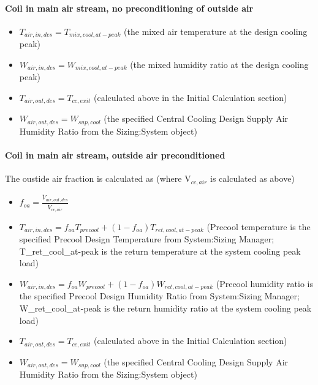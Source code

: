 \paragraph{\texorpdfstring{\textbf{Coil in main air stream, no preconditioning of outside air} }{Coil in main air stream, no preconditioning of outside air }}\label{coil-in-main-air-stream-no-preconditioning-of-outside-air}

\begin{itemize}
\item
  \(T_{air,in,des} = T_{mix,cool,at-peak}\) (the mixed air temperature at the design cooling peak)
\item
  \(W_{air,in,des} = W_{mix,cool,at-peak}\) (the mixed humidity ratio at the design cooling peak)
\item
  \(T_{air,out,des} = T_{cc,exit}\) (calculated above in the Initial Calculation section)
\item
  \(W_{air,out,des} = W_{sup,cool}\) (the specified Central Cooling Design Supply Air Humidity Ratio from the Sizing:System object)
\end{itemize}

\paragraph{\texorpdfstring{\textbf{Coil in main air stream, outside air preconditioned} }{Coil in main air stream, outside air preconditioned }}\label{coil-in-main-air-stream-outside-air-preconditioned}

The oustide air fraction is calculated as (where V\(_{cc,air}\) is calculated as above)

\begin{itemize}
\item
  \(f_{oa} = \frac{\dot V_{air,out,des}}{\dot{V}_{cc,air}}\)
\item
  \(T_{air,in,des} = f_{oa}T_{precool} + \left(1-f_{oa}\right)T_{ret,cool,at-peak}\) (Precool temperature is the specified Precool Design Temperature from System:Sizing Manager; T\_ret\_cool\_at-peak is the return temperature at the system cooling peak load)
\item
  \(W_{air,in,des} = f_{oa}W_{precool} + \left(1-f_{oa}\right)W_{ret,cool,at-peak}\) (Precool humidity ratio is the specified Precool Design Humidity Ratio from System:Sizing Manager; W\_ret\_cool\_at-peak is the return humidity ratio at the system cooling peak load)
\item
  \(T_{air,out,des} = T_{cc,exit}\) (calculated above in the Initial Calculation section)
\item
  \(W_{air,out,des} = W_{sup,cool}\) (the specified Central Cooling Design Supply Air Humidity Ratio from the Sizing:System object)
\end{itemize}

